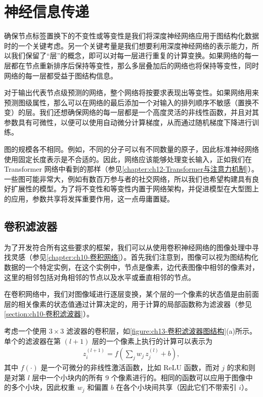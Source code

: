 \documentclass[../../main.tex]{subfiles}
\begin{document}
\section{神经信息传递}\label{section:ch13-神经信息传递}

确保节点标签置换下的不变性或等变性是我们将深度神经网络应用于图结构化数据时的一个关键考虑。另一个关键考量是我们想要利用深度神经网络的表示能力，所以我们保留了“层”的概念，即可以对每一层进行重复的计算变换。如果网络的每一层都在节点重新排序后保持等变性，那么多层叠加后的网络也将保持等变性，同时网络的每一层都受益于图结构信息。

对于输出代表节点级预测的网络，整个网络将按要求表现出等变性。如果网络用来预测图级属性，那么可以在网络的最后添加一个对输入的排列顺序不敏感（置换不变）的层。我们还想确保网络的每一层都是一个高度灵活的非线性函数，并且对其参数具有可微性，以便可以使用自动微分计算梯度，从而通过随机梯度下降进行训练。

图的规模各不相同。例如，不同的分子可以有不同数量的原子，因此标准神经网络使用固定长度表示是不合适的。因此，网络应该能够处理变长输入，正如我们在 Transformer 网络中看到的那样（参见\cref{chapter:ch12-Transformer与注意力机制}）。一些图可能非常大，例如有数百万参与者的社交网络，所以我们也希望构建具有良好扩展性的模型。为了将不变性和等变性内置于网络架构，并促进模型在大型图上的应用，参数共享将发挥重要作用，这一点毋庸置疑。

\subsection{卷积滤波器}\label{subsection:ch13-卷积滤波器}

为了开发符合所有这些要求的框架，我们可以从使用卷积神经网络的图像处理中寻找灵感（参见\cref{chapter:ch10-卷积网络}）。首先我们注意到，图像可以视为图结构化数据的一个特定实例，在这个实例中，节点是像素，边代表图像中相邻的像素对，这里的相邻包括对角相邻的节点以及水平或垂直相邻的节点。

在卷积网络中，我们对图像域进行逐层变换，某个层的一个像素的状态值是由前面层的相关像素的状态值通过计算决定的，用于计算的局部函数称为滤波器（参见\cref{section:ch10-卷积滤波器}）。

\begin{definition}[卷积滤波器]\label{definition:ch13-卷积滤波器}
考虑一个使用 $3\times 3$ 滤波器的卷积层，如\cref{figure:ch13-卷积滤波器图结构}(a)所示。单个的滤波器在第 $(l+1)$ 层的一个像素上执行的计算可以表示为
\begin{align}
z_i^{(l+1)}=f\!\left(\sum_j w_j\,z_j^{(l)}+b\right),
\label{align:ch13-卷积滤波}
\end{align}
其中 $f(\cdot)$ 是一个可微分的非线性激活函数，比如 ReLU 函数，而对 $j$ 的求和则是对第 $l$ 层中一个小块内的所有 $9$ 个像素进行的。相同的函数可以应用于图像中的多个小块，因此权重 $w_j$ 和偏置 $b$ 在各个小块间共享（因此它们不带索引 $i$）。
\end{definition}
\end{document}
